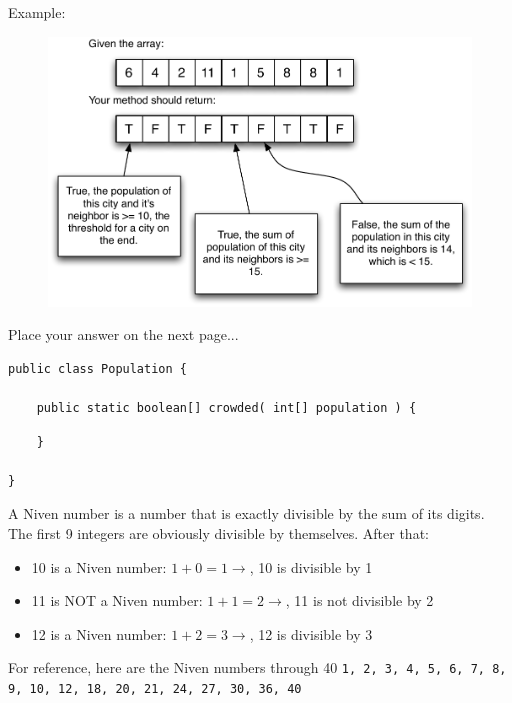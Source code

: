 \documentclass[11pt,answers]{exam}
\begin{document}
\begin{questions}
\par Example:
\begin{figure}[h]
    \begin{center}
        \includegraphics[width=6in]{finalExam_progQuestion_4}
    \end{center}
\end{figure}

\par Place your answer on the next page...

\newpage
\begin{verbatim}
public class Population {
    
    public static boolean[] crowded( int[] population ) {	
\end{verbatim}

\begin{solution}[6in]
\end{solution}

\begin{verbatim}
    }

}	
\end{verbatim}

\newpage

\question[5] A Niven number is a number that is exactly divisible by the sum of its digits.   The first 9 integers are obviously divisible by themselves.   After that:
\begin{itemize}
	\item 10 is a Niven number: $1 + 0 = 1 \rightarrow$, 10 is divisible by 1
	\item 11 is NOT a Niven number: $1 + 1 = 2 \rightarrow$, 11 is not divisible by 2
	\item 12 is a Niven number: $1 + 2 = 3 \rightarrow$, 12 is divisible by 3
\end{itemize}
For reference, here are the Niven numbers through 40 \newline
{\tt 1, 2, 3, 4, 5, 6, 7, 8, 9, 10, 12, 18, 20, 21, 24, 27, 30, 36, 40} \newline


\end{questions}
\end{document}

